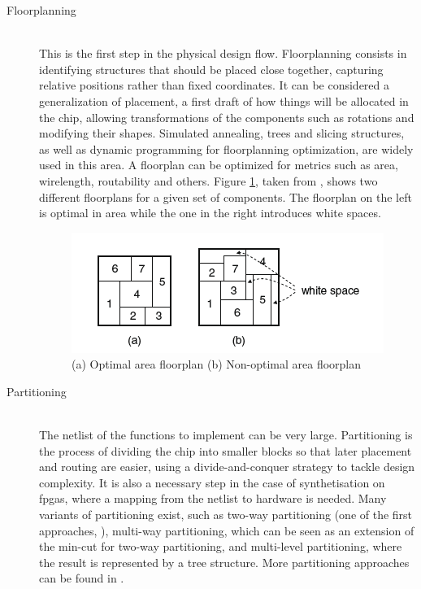 \begin{description}
  \item[Floorplanning] \hfill \\
  This is the first step in the physical design flow. Floorplanning consists in identifying structures that should be placed close together, capturing relative positions rather than fixed coordinates. It can be considered a generalization of placement, a first draft of how things will be allocated in the chip, allowing transformations of the components such as rotations and modifying their shapes. Simulated annealing, trees and slicing structures, as well as dynamic programming for floorplanning optimization\cite{floorplan}, are widely used in this area. A floorplan can be optimized for metrics such as area, wirelength, routability and others. Figure \ref{fig:floorplan}, taken from \cite{changcheng}, shows two different floorplans for a given set of components. The floorplan on the left is optimal in area while the one in the right introduces white spaces.
  
\begin{figure}[h!]
  \centering
  \includegraphics[scale=0.6]{img/bckgrnd/floorplan.png}
  \caption{(a) Optimal area floorplan (b) Non-optimal area floorplan}
  \label{fig:floorplan}
\end{figure}   
  
  \item[Partitioning] \hfill \\
  The netlist of the functions to implement can be very large. Partitioning is the process of dividing the chip into smaller blocks so that later placement and routing are easier, using a divide-and-conquer strategy to tackle design complexity. It is also a necessary step in the case of synthetisation on \glspl{fpga}, where a mapping from the netlist to hardware is needed. Many variants of partitioning exist, such as two-way partitioning (one of the first approaches, \cite{partitioning}), multi-way partitioning, which can be seen as an extension of the min-cut for two-way partitioning, and multi-level partitioning, where the result is represented by a tree structure. More partitioning approaches can be found in \cite{tutorialpartitioning}.
  

\end{description}

